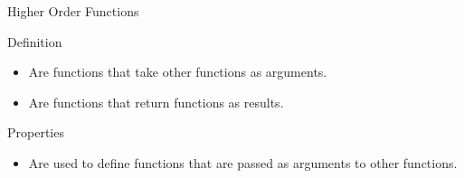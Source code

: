 \begin{frame}{Higher Order Functions}
    \begin{block}{Definition}
        \begin{itemize}
            \item Are functions that take other functions as arguments.
            \item Are functions that return functions as results.
        \end{itemize}
    \end{block}
    \begin{block}{Properties}
        \begin{itemize}
            \item Are used to define functions that are passed as arguments to other functions.
        \end{itemize}
    \end{block}
\end{frame}